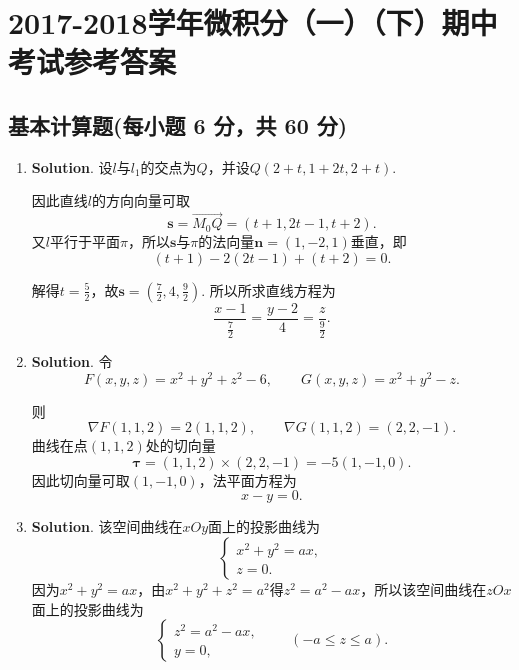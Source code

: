 \documentclass[../main.tex]{subfiles}
\begin{document}
\chapter{2017-2018学年微积分（一）（下）期中考试参考答案}
\section{基本计算题(每小题 6 分，共 60 分)}
\begin{enumerate}
    \item \textbf{Solution}. 设$l$与$l_{1}$的交点为$Q$，并设$Q(2+t,1+2t,2+t)$.

          因此直线$l$的方向向量可取
          \[
              \boldsymbol{s}=\overrightarrow{M_0Q}=(t+1,2t-1,t+2).
          \]
          又$l$平行于平面$\pi$，所以$\boldsymbol{s}$与$\pi$的法向量$\boldsymbol{n}=(1
              ,-2,1)$垂直，即
          \[
              (t+1)-2(2t-1)+(t+2)=0.
          \]

          解得$t=\frac{5}{2}$，故$\boldsymbol{s}=\left(\frac{7}{2},4,\frac{9}{2}\right
              )$. 所以所求直线方程为
          \[
              \frac{x-1}{\frac{7}{2}}=\frac{y-2}{4}=\frac{z}{\frac{9}{2}}.
          \]

    \item \textbf{Solution}. 令
          \[
              F(x,y,z)=x^{2}+y^{2}+z^{2}-6,\qquad G(x,y,z)=x^{2}+y^{2}-z.
          \]

          则
          \[
              \nabla F(1,1,2)=2(1,1,2),\qquad \nabla G(1,1,2)=(2,2,-1).
          \]
          曲线在点$(1,1,2)$处的切向量
          \[
              \boldsymbol{\tau}=(1,1,2)\times(2,2,-1)=-5(1,-1,0).
          \]
          因此切向量可取$(1,-1,0)$，法平面方程为
          \[
              x-y=0.
          \]

    \item \textbf{Solution}. 该空间曲线在$xOy$面上的投影曲线为
          \[
              \begin{cases}
                  x^{2}+y^{2}=ax, \\
                  z=0.
              \end{cases}
          \]
          因为$x^{2}+y^{2}=ax$，由$x^{2}+y^{2}+z^{2}=a^{2}$得$z^{2}=a^{2}-ax$，所以该空间曲线在$z
              Ox$面上的投影曲线为
          \[
              \begin{cases}
                  z^{2}=a^{2}-ax, \\
                  y=0,
              \end{cases}\qquad (-a\leq z\leq a).
          \]


\end{enumerate}
\end{document}
